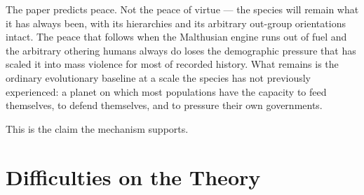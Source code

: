 \documentclass[12pt,letterpaper]{article}
\begin{document}
The paper predicts peace. Not the peace of virtue --- the species will
remain what it has always been, with its hierarchies and its arbitrary
out-group orientations intact. The peace that follows when the
Malthusian engine runs out of fuel and the arbitrary othering humans
always do loses the demographic pressure that has scaled it into mass
violence for most of recorded history. What remains is the ordinary
evolutionary baseline at a scale the species has not previously
experienced: a planet on which most populations have the capacity to
feed themselves, to defend themselves, and to pressure their own
governments.

This is the claim the mechanism supports.

\section{Difficulties on the Theory}\label{difficulties-on-the-theory}
\end{document}
